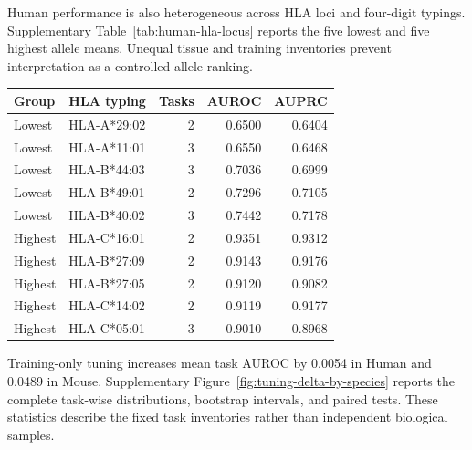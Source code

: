 Human performance is also heterogeneous across HLA loci and four-digit typings. Supplementary Table~\ref{tab:human-hla-locus} reports the five lowest and five highest allele means. Unequal tissue and training inventories prevent interpretation as a controlled allele ranking.

\begin{center}
\begin{minipage}{\columnwidth}
\label{tab:human-hla-locus}
\centering
\scriptsize
\begin{tabularx}{\columnwidth}{lXrrr}
\toprule
Group & HLA typing & Tasks & AUROC & AUPRC \\
\midrule
Lowest & HLA-A*29:02 & 2 & 0.6500 & 0.6404 \\
Lowest & HLA-A*11:01 & 3 & 0.6550 & 0.6468 \\
Lowest & HLA-B*44:03 & 3 & 0.7036 & 0.6999 \\
Lowest & HLA-B*49:01 & 2 & 0.7296 & 0.7105 \\
Lowest & HLA-B*40:02 & 3 & 0.7442 & 0.7178 \\
\midrule
Highest & HLA-C*16:01 & 2 & 0.9351 & 0.9312 \\
Highest & HLA-B*27:09 & 2 & 0.9143 & 0.9176 \\
Highest & HLA-B*27:05 & 2 & 0.9120 & 0.9082 \\
Highest & HLA-C*14:02 & 2 & 0.9119 & 0.9177 \\
Highest & HLA-C*05:01 & 3 & 0.9010 & 0.8968 \\
\bottomrule
\end{tabularx}
\end{minipage}
\end{center}

Training-only tuning increases mean task AUROC by 0.0054 in Human and 0.0489 in Mouse. Supplementary Figure~\ref{fig:tuning-delta-by-species} reports the complete task-wise distributions, bootstrap intervals, and paired tests. These statistics describe the fixed task inventories rather than independent biological samples.

